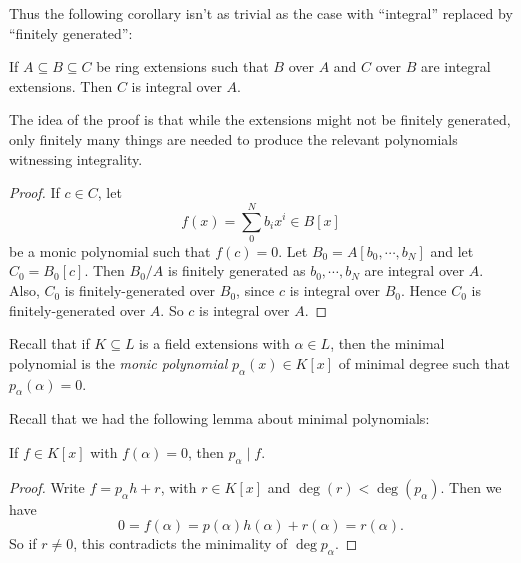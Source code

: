 \documentclass[a4paper]{article}
\begin{document}
Thus the following corollary isn't as trivial as the case with ``integral'' replaced by ``finitely generated'':
\begin{cor}
  If $A \subseteq B \subseteq C$ be ring extensions such that $B$ over $A$ and $C$ over $B$ are integral extensions. Then $C$ is integral over $A$.
\end{cor}

The idea of the proof is that while the extensions might not be finitely generated, only finitely many things are needed to produce the relevant polynomials witnessing integrality.

\begin{proof}
  If $c \in C$, let
  \[
    f(x) = \sum_{0}^N b_i x^i \in B[x]
  \]
  be a monic polynomial such that $f(c) = 0$. Let $B_0 = A[b_0, \cdots, b_N]$ and let $C_0 = B_0[c]$. Then $B_0/A$ is finitely generated as $b_0, \cdots, b_N$ are integral over $A$. Also, $C_0$ is finitely-generated over $B_0$, since $c$ is integral over $B_0$. Hence $C_0$ is finitely-generated over $A$. So $c$ is integral over $A$.
\end{proof}

Recall that if $K \subseteq L$ is a field extensions with $\alpha \in L$, then the minimal polynomial is the \emph{monic polynomial} $p_\alpha(x) \in K[x]$ of minimal degree such that $p_\alpha(\alpha) = 0$.

Recall that we had the following lemma about minimal polynomials:
\begin{lemma}
  If $f \in K[x]$ with $f(\alpha) = 0$, then $p_\alpha \mid f$.
\end{lemma}

\begin{proof}
  Write $f = p_\alpha h + r$, with $r \in K[x]$ and $\deg(r) < \deg (p_\alpha)$. Then we have
  \[
    0 = f(\alpha) = p(\alpha) h(\alpha) + r(\alpha) = r(\alpha).
  \]
  So if $r \not= 0$, this contradicts the minimality of $\deg p_\alpha$.
\end{proof}
\end{document}
